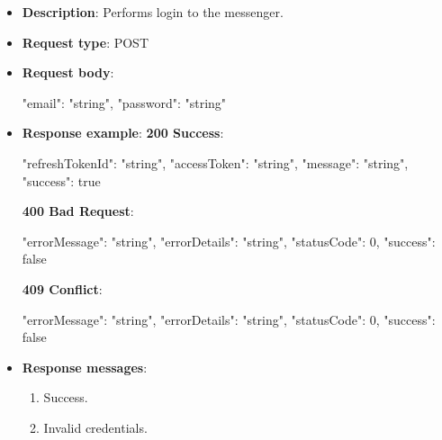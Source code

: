 \begin{itemize}
    \begin{itemize}
        \item \textbf{Description}: Performs login to the messenger.
        \item \textbf{Request type}: POST
        \item \textbf{Request body}:
        \begin{spverbatim}
        {
            "email": "string",
            "password": "string"
        }
        \end{spverbatim}
        \item \textbf{Response example}:
        \textbf{200 Success}:
        \begin{spverbatim}
        {
            "refreshTokenId": "string",
            "accessToken": "string",
            "message": "string",
            "success": true
        }
        \end{spverbatim}
        \textbf{400 Bad Request}:
        \begin{spverbatim}
        {
            "errorMessage": "string",
            "errorDetails": "string",
            "statusCode": 0,
            "success": false
        }
        \end{spverbatim}
        \textbf{409 Conflict}:
        \begin{spverbatim}
        {
            "errorMessage": "string",
            "errorDetails": "string",
            "statusCode": 0,
            "success": false
        }
        \end{spverbatim}
        \item \textbf{Response messages}:
        \begin{enumerate}
            \item Success.
            \item Invalid credentials.
        \end{enumerate}
    \end{itemize}



\end{itemize}
